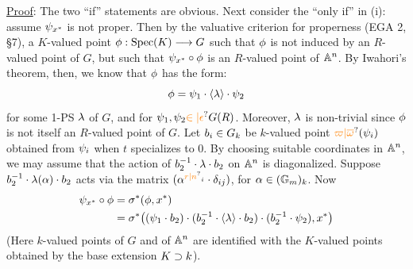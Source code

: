 \uline{Proof}: The two ``if'' statements are obvious. Next consider the ``only if'' in (i): assume $\psi_{x^*}$ is not proper. Then by the valuative criterion for properness (EGA 2, \S7),  a $K$-valued point $\phi:\operatorname{Spec}(K)\longrightarrow G$ such that $\phi$ is not induced by an $R$-valued point of $G$, but such that $\psi_{x^*}\circ\phi$ is an $R$-valued point of $\mathbb{A}^n$. By Iwahori's theorem, then, we know that $\phi$ has the form:
\[
\phi=\psi_1\cdot\langle\lambda\rangle\cdot\psi_2
\]
for some 1-PS $\lambda$ of $G$, and for $\handwritten{\psi}_1,\handwritten{\psi}_2\handwritten{\unsure{\in|\epsilon}}G(R)$. Moreover, $\lambda$ is non-trivial since $\phi$ is not itself an $R$-valued point of $G$. Let $b_i\in G_k$ be $k$-valued point $\handwritten{\unsure{\varpi|\overline{\omega}}}(\handwritten{\psi}_i)$ obtained from $\psi_i$ when $t$ specializes to $0$. By choosing suitable coordinates in $\mathbb{A}^n$, we may assume that the action of $b_2^{-1}\cdot\lambda\cdot b_2$ on $\mathbb{A}^n$ is diagonalized. Suppose $b_2^{-1}\cdot\lambda(\alpha)\cdot b_2$ acts via the matrix $(\handwritten{\alpha}^{\handwritten{\unsure{r|n}_i}}\cdot\handwritten{\delta}_{ij})$, for $\alpha\in(\mathbb{G}_m)_k$. Now
\[
\begin{aligned}
\psi_{x^*}\circ\phi&=\sigma^*(\phi,x^*)\\
&=\sigma^*\bigl((\psi_1\cdot b_2)\cdot(b_2^{-1}\cdot\langle\lambda\rangle\cdot b_2)\cdot(b_2^{-1}\cdot\psi_2),x^*\bigr)
\end{aligned}
\]
(Here $k$-valued points of $G$ and of $\mathbb{A}^n$ are identified with the $K$-valued points obtained by the base extension $K\supset k$).
